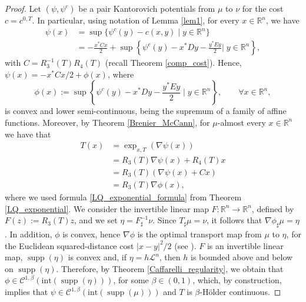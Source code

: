 \documentclass[reqno]{amsart}
\DeclareMathOperator{\supp}{supp}
\theoremstyle{plain}
\theoremstyle{definition}
\theoremstyle{remark}
\begin{document}
		\begin{proof}
			Let $(\psi,\psi^c)$ be a pair Kantorovich potentials from  $\mu$ to $ \nu$ for the cost $c=c^{0,T}$. In particular, using notation of Lemma \ref{lem1}, for every $x\in\mathbb{R}^n$, we have
			\begin{align}
				\psi(x)&=\sup\big\{\psi^c(y)-c(x,y)\mid y\in\mathbb{R}^n\big\}\\
					&=-\frac{x^*Cx}{2}+\sup\left\{\psi^c(y)-x^*Dy-\frac{y^*Ey}{2}\bigg|\;y\in\mathbb{R}^n\right\},
			\end{align}
			with $C=R_3^{-1}(T)R_4(T)$ (recall Theorem \ref{comp_cost}).
			Hence, $\psi(x)=-x^*Cx/2+\phi(x)$, where 
			\begin{equation}
				\phi(x):=\sup\left\{\psi^c(y)-x^*Dy-\frac{y^*Ey}{2}\;\bigg|\;y\in\mathbb{R}^n\right\},\qquad\forall x\in\mathbb{R}^n,
			\end{equation}
			is convex and lower semi-continuous, being the supremum of a family of affine functions.
			Moreover, by Theorem \ref{Brenier_McCann}, for $\mu$-almost every $x\in\mathbb{R}^n$ we have that
			\begin{align}
				T(x)&=\exp_{x,T}(\nabla\psi(x))\\
						&=R_3(T)\nabla\psi(x)+R_4(T)x\\
						&=R_3(T)\left(\nabla\psi(x)+Cx\right)\\
						&=R_3(T)\nabla\phi(x),
			\end{align}
			where we used formula \eqref{LQ_exponential_formula} from Theorem \ref{LQ_exponential}.
			We consider the invertible linear map $F:\mathbb{R}^n\to\mathbb{R}^n$, defined by $F(z):=R_3(T)z$, and we set $\eta=F^{-1}_{\sharp}\nu$. Since $T_{\sharp}\mu=\nu$, it follows that $\nabla\phi_{\sharp}\mu=\eta$. In addition, $\phi$ is convex, hence $\nabla\phi$ is the optimal transport map from $\mu$ to $\eta$, for the Euclidean squared-distance cost $|x-y|^2/2$ (see \cite[Theorem 1.3]{Brenier1991}). $F$ is an invertible linear map, $\supp(\eta)$ is convex and, if $\eta=h\mathscr{L}^n$, then $h$ is bounded above and below on $\supp(\eta)$. Therefore, by Theorem \ref{Caffarelli_regularity}, we obtain that $\phi\in\mathcal{C}^{1,\beta}(\mathrm{int}(\supp(\eta)))$, for some $\beta\in(0,1)$, which, by construction, implies that $\psi\in\mathcal{C}^{1,\beta}(\mathrm{int}(\supp(\mu)))$ and $T$ is $\beta$-Hölder continuous. 
		\end{proof}
\end{document}
